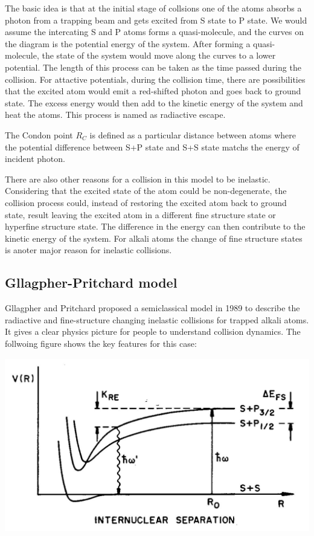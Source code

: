 \documentclass{article}
\begin{document}
The basic idea is that at the initial stage of collsions one of the atoms absorbs a photon from a trapping beam and gets excited from S state to P state.  We would assume the intercating S and P atoms forms a quasi-molecule, and the curves on the diagram is the potential energy of the system. After forming a quasi-molecule, the state of the system would move along the curves to a lower potential. The length of this process can be taken as the time passed during the collision. For attactive potentials, during the collision time, there are possibilities that the excited atom would emit a red-shifted photon and goes back to ground state.  The excess energy would then add to the kinetic energy of the system and heat the atoms. This process is named as radiactive escape. 

The Condon point $R_C$ is defined as a particular distance between atoms where the potential difference between S+P state and S+S state matchs the energy of incident photon.


There are also other reasons for a collision in this model to be inelastic. Considering that the excited state of the atom could be non-degenerate, the collision process could, instead of restoring the excited atom back to ground state,  result leaving the excited atom in a different fine structure state or hyperfine structure state. The difference in the energy can then contribute to the kinetic energy of the system. For alkali atoms the change of fine structure states is anoter major reason for inelastic collisions.



\subsection{Gllagpher-Pritchard model}
Gllagpher and Pritchard proposed a semiclassical model in 1989 to describe the radiactive and fine-structure changing inelastic collisions for trapped alkali atoms. It gives a clear physics picture for people to understand collision dynamics. The follwoing figure shows the key features for this case:

\includegraphics[height=3in]{G-P.JPG}
\end{document}
